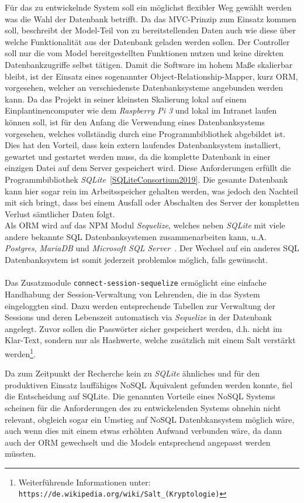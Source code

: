 Für das zu entwickelnde System soll ein möglichst flexibler Weg gewählt werden was die Wahl der Datenbank betrifft. Da das MVC-Prinzip zum Einsatz kommen soll, beschreibt der Model-Teil von zu bereitstellenden Daten auch wie diese über welche Funktionalität aus der Datenbank geladen werden sollen. Der Controller soll nur die vom Model bereitgestellten Funktionen nutzen und keine direkten Datenbankzugriffe selbst tätigen. Damit die Software im hohem Maße skalierbar bleibt, ist der Einsatz eines sogenannter Object-Relationship-Mapper, kurz ORM, vorgesehen, welcher an verschiedenste Datenbanksysteme angebunden werden kann. Da das Projekt in seiner kleinsten Skalierung lokal auf einem Einplantinencomputer wie dem \emph{Raspberry Pi 3} und lokal im Intranet laufen können soll, ist für den Anfang die Verwendung eines Datenbanksystems vorgesehen, welches vollständig durch eine Programmbibliothek abgebildet ist. Dies hat den Vorteil, dass kein extern laufendes Datenbanksystem installiert, gewartet und gestartet werden muss, da die komplette Datenbank in einer einzigen Datei auf dem Server gespeichert wird. Diese Anforderungen erfüllt die Programmbibliothek \emph{SQLite}~\ref{SQLiteConsortium2019}. Die gesamte Datenbank kann hier sogar rein im Arbeitsspeicher gehalten werden, was jedoch den Nachteil mit sich bringt, dass bei einem Ausfall oder Abschalten des Server der kompletten Verlust sämtlicher Daten folgt. 
\\ Als ORM wird auf das NPM Modul \emph{Sequelize}, welches neben \emph{SQLite} mit viele andere bekannte SQL Datenbanksystemen zusammenarbeiten kann, u.A. \emph{Postgres}, \emph{MariaDB} und \emph{Microsoft SQL Server}~\cite{Depold2019}. Der Wechsel auf ein anderes SQL Datenbanksystem ist somit jederzeit problemlos möglich, falls gewünscht. \\ \\  
Das Zusatzmodule \texttt{connect-session-sequelize} ermöglicht eine einfache Handhabung der Session-Verwaltung von Lehrenden, die in das System eingeloggten sind. Dazu werden entsprechende Tabellen zur Verwaltung der Sessions und deren Lebenszeit automatisch via \emph{Sequelize} in der Datenbank angelegt. Zuvor sollen die Passwörter sicher gespeichert werden, d.h. nicht im Klar-Text, sondern nur als Hashwerte, welche zusätzlich mit einem Salt verstärkt werden\footnote{Weiterführende Informationen unter:  \texttt{https://de.wikipedia.org/wiki/Salt\_(Kryptologie)}}.

Da zum Zeitpunkt der Recherche kein zu \emph{SQLite} ähnliches und für den produktiven Einsatz lauffähiges NoSQL Äquivalent gefunden werden konnte, fiel die Entscheidung auf SQLite. Die genannten Vorteile eines NoSQL Systems scheinen für die Anforderungen des zu entwickelenden Systems ohnehin nicht relevant, obgleich sogar ein Umstieg auf NoSQL Datenbkansystem möglich wäre, auch wenn dies mit einem etwas erhöhten Aufwand verbunden wäre, da dann auch der ORM gewechselt und die Models entsprechend angepasst werden müssten.  

